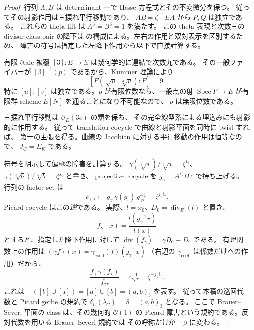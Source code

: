 \begin{proof}
行列 $A,B$ は determinant 一で Hesse 方程式とその不変微分を保つ。
従ってその射影作用は三捩れ平行移動であり、
$AB=\zeta^{-1}BA$ から $P,Q$ は独立である。
これらの theta lift は $A^3=B^3=1$ を満たす。
この theta 表現と次数三の divisor-class pair の降下は
\cite[Sections~1.1, 1.3, 1.6, Proposition~2.2, Lemma~2.4]{NFMCremonaFisherDescentAlgebra}
の構成による。左右の作用と双対表示を区別するため、
障害の符号は指定した左降下作用から以下で直接計算する。

有限 \'etale 被覆 $[3]:E\to E$ は幾何学的に連結で次数九である。
その一般ファイバーが $[3]^{-1}(p)$ であるから、Kummer 理論により
\[
 [F(\sqrt[3]{u},\sqrt[3]{v}):F]=9.
\]
特に $[u],[v]$ は独立である。$p$ が有限位数なら、一般点の射
$\operatorname{Spec}F\to E$ が有限群 scheme $E[N]$ を通ることになり不可能なので、
$p$ は無限位数である。

三捩れ平行移動は $\mathcal O_E(3o)$ の類を保ち、
その完全線型系による埋込みにも射影的に作用する。
従って translation cocycle で曲線と射影平面を同時に twist すれば、
第一の主張を得る。曲線の Jacobian に対する平行移動の作用は恒等なので、
$J_C=E_K$ である。

符号を明示して偏極の障害を計算する。
$\gamma(\sqrt[3]{a})/\sqrt[3]{a}=\zeta^{i_\gamma}$、
$\gamma(\sqrt[3]{b})/\sqrt[3]{b}=\zeta^{j_\gamma}$ と書き、
projective cocycle を $g_\gamma=A^{i_\gamma}B^{j_\gamma}$ で持ち上げる。
行列の factor set は
\[
 c_{\gamma,\tau}
 :=g_\gamma\,\gamma(g_\tau)\,g_{\gamma\tau}^{-1}
       =\zeta^{j_\gamma i_\tau}.
\]
Picard cocycle はこの\emph{逆}である。
実際、$l=x_0$、$D_0=\operatorname{div}_E(l)$ と置き、
\[
 f_\gamma(x)=\frac{l(g_\gamma^{-1}x)}{l(x)}
\]
とすると、指定した降下作用に対して
$\operatorname{div}(f_\gamma)=\gamma D_0-D_0$ である。
有理関数上の作用は
$(\gamma f)(x)=\gamma_{\mathrm{coeff}}(f)(g_\gamma^{-1}x)$
（右辺の $\gamma_{\mathrm{coeff}}$ は係数だけへの作用）だから、
\[
 \frac{f_\gamma\,\gamma(f_\tau)}{f_{\gamma\tau}}
       =c_{\gamma,\tau}^{-1}
       =\zeta^{-j_\gamma i_\tau}.
\]
これは $-([b]\cup[a])=[a]\cup[b]=(a,b)_3$ を表す。
従って本稿の巡回代数と Picard gerbe の規約で
$\delta_C(\lambda_C)=\beta=(a,b)_3$ となる。
ここで Brauer--Severi 平面の class は、その幾何的 $\mathcal O(1)$ の
Picard 障害という規約である。反対代数を用いる Brauer--Severi 規約では
その呼称だけが $-\beta$ に変わる。


\end{proof}
